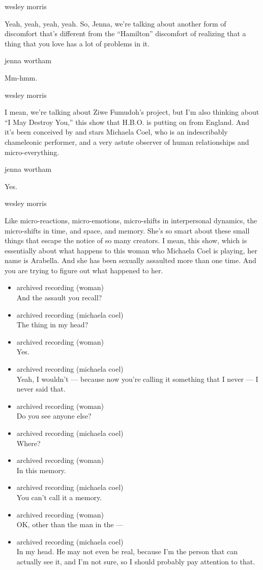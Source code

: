 wesley morris

Yeah, yeah, yeah, yeah. So, Jenna, we're talking about another form of
discomfort that's different from the ``Hamilton'' discomfort of
realizing that a thing that you love has a lot of problems in it.

jenna wortham

Mm-hmm.

wesley morris

I mean, we're talking about Ziwe Fumudoh's project, but I'm also
thinking about ``I May Destroy You,'' this show that H.B.O. is putting
on from England. And it's been conceived by and stars Michaela Coel, who
is an indescribably chameleonic performer, and a very astute observer of
human relationships and micro-everything.

jenna wortham

Yes.

wesley morris

Like micro-reactions, micro-emotions, micro-shifts in interpersonal
dynamics, the micro-shifts in time, and space, and memory. She's so
smart about these small things that escape the notice of so many
creators. I mean, this show, which is essentially about what happens to
this woman who Michaela Coel is playing, her name is Arabella. And she
has been sexually assaulted more than one time. And you are trying to
figure out what happened to her.

\begin{itemize}
\item
  archived recording (woman)\\
  And the assault you recall?
\item
  archived recording (michaela coel)\\
  The thing in my head?
\item
  archived recording (woman)\\
  Yes.
\item
  archived recording (michaela coel)\\
  Yeah, I wouldn't --- because now you're calling it something that I
  never --- I never said that.
\item
  archived recording (woman)\\
  Do you see anyone else?
\item
  archived recording (michaela coel)\\
  Where?
\item
  archived recording (woman)\\
  In this memory.
\item
  archived recording (michaela coel)\\
  You can't call it a memory.
\item
  archived recording (woman)\\
  OK, other than the man in the ---
\item
  archived recording (michaela coel)\\
  In my head. He may not even be real, because I'm the person that can
  actually see it, and I'm not sure, so I should probably pay attention
  to that.
\end{itemize}

